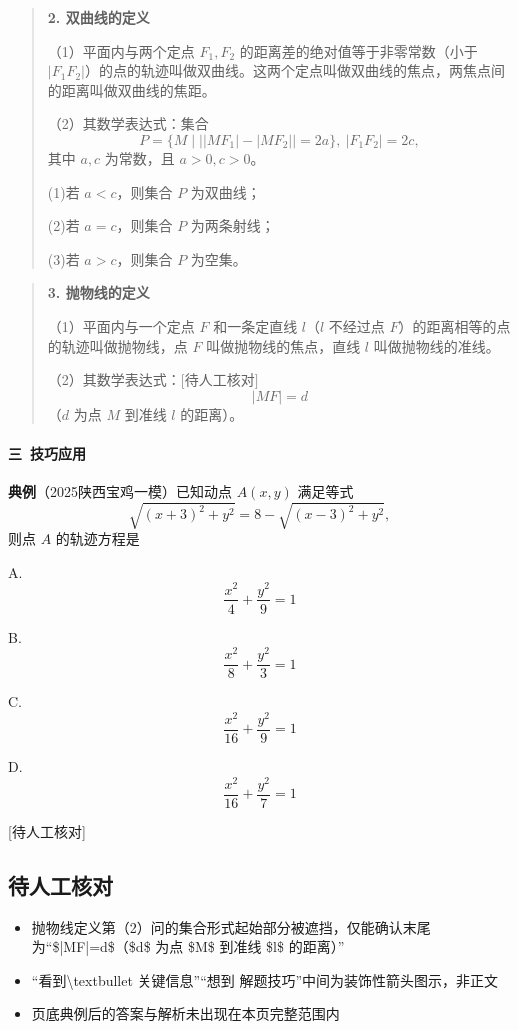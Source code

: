 \documentclass[UTF8,a4paper,11pt]{ctexart}
\begin{document}
\begin{quote}
\textbf{2. 双曲线的定义}

（1）平面内与两个定点 $F_1,F_2$ 的距离差的绝对值等于非零常数（小于 $|F_1F_2|$）的点的轨迹叫做双曲线。这两个定点叫做双曲线的焦点，两焦点间的距离叫做双曲线的焦距。

（2）其数学表达式：集合
\[
P=\{M\mid \bigl||MF_1|-|MF_2|\bigr|=2a\},\ |F_1F_2|=2c,
\]
其中 $a,c$ 为常数，且 $a>0,c>0$。

(1)若 $a<c$，则集合 $P$ 为双曲线；

(2)若 $a=c$，则集合 $P$ 为两条射线；

(3)若 $a>c$，则集合 $P$ 为空集。
\end{quote}

\begin{quote}
\textbf{3. 抛物线的定义}

（1）平面内与一个定点 $F$ 和一条定直线 $l$（$l$ 不经过点 $F$）的距离相等的点的轨迹叫做抛物线，点 $F$ 叫做抛物线的焦点，直线 $l$ 叫做抛物线的准线。

（2）其数学表达式：$\text{[待人工核对]}$
\[
|MF|=d
\]
（$d$ 为点 $M$ 到准线 $l$ 的距离）。
\end{quote}

\paragraph{三\ 技巧应用}

\textbf{典例}（2025陕西宝鸡一模）已知动点 $A(x,y)$ 满足等式
\[
\sqrt{(x+3)^2+y^2}=8-\sqrt{(x-3)^2+y^2},
\]
则点 $A$ 的轨迹方程是

A. \[\frac{x^2}{4}+\frac{y^2}{9}=1\]

B. \[\frac{x^2}{8}+\frac{y^2}{3}=1\]

C. \[\frac{x^2}{16}+\frac{y^2}{9}=1\]

D. \[\frac{x^2}{16}+\frac{y^2}{7}=1\]

[待人工核对]

\subsection*{待人工核对}

\begin{itemize}

\item 抛物线定义第（2）问的集合形式起始部分被遮挡，仅能确认末尾为“\$|MF|=d\$（\$d\$ 为点 \$M\$ 到准线 \$l\$ 的距离）”

\item “看到\textbackslash{}textbullet 关键信息”“想到 解题技巧”中间为装饰性箭头图示，非正文

\item 页底典例后的答案与解析未出现在本页完整范围内

\end{itemize}
\end{document}
